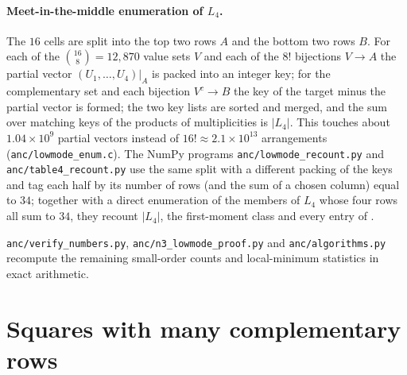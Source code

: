 \paragraph{Meet-in-the-middle enumeration of $L_4$.}
The $16$ cells are split into the top two rows $A$ and the bottom two rows $B$.
For each of the $\binom{16}{8}=12{,}870$ value sets $V$ and each of the $8!$ bijections $V\to A$ the partial vector $(U_1,\dots,U_4)|_A$ is packed into an integer key; for the complementary set and each bijection $V^c\to B$ the key of the target minus the partial vector is formed; the two key lists are sorted and merged, and the sum over matching keys of the products of multiplicities is $|L_4|$.
This touches about $1.04\times10^9$ partial vectors instead of $16!\approx2.1\times10^{13}$ arrangements (\texttt{anc/lowmode\_enum.c}).
The NumPy programs \texttt{anc/lowmode\_recount.py} and \texttt{anc/table4\_recount.py} use the same split with a different packing of the keys and tag each half by its number of rows (and the sum of a chosen column) equal to $34$; together with a direct enumeration of the members of $L_4$ whose four rows all sum to $34$, they recount $|L_4|$, the first-moment class and every entry of .

\texttt{anc/verify\_numbers.py}, \texttt{anc/n3\_lowmode\_proof.py} and \texttt{anc/algorithms.py} recompute the remaining small-order counts and local-minimum statistics in exact arithmetic.

\section{Squares with many complementary rows}
\label{sec:app_twin}

